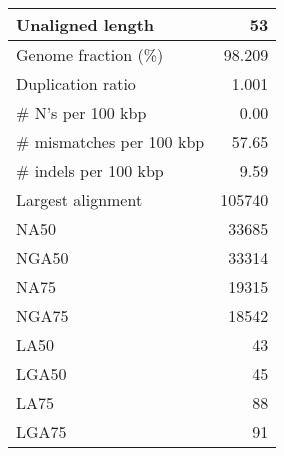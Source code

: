 \documentclass[12pt,a4paper]{article}
\begin{document}
\begin{table}[ht]
\begin{center}
\begin{tabular}{|l*{1}{|r}|}
Unaligned length & 53 \\ \hline
Genome fraction (\%) & 98.209 \\ \hline
Duplication ratio & 1.001 \\ \hline
\# N's per 100 kbp & 0.00 \\ \hline
\# mismatches per 100 kbp & 57.65 \\ \hline
\# indels per 100 kbp & 9.59 \\ \hline
Largest alignment & 105740 \\ \hline
NA50 & 33685 \\ \hline
NGA50 & 33314 \\ \hline
NA75 & 19315 \\ \hline
NGA75 & 18542 \\ \hline
LA50 & 43 \\ \hline
LGA50 & 45 \\ \hline
LA75 & 88 \\ \hline
LGA75 & 91 \\ \hline
\end{tabular}
\end{center}
\end{table}
\end{document}
